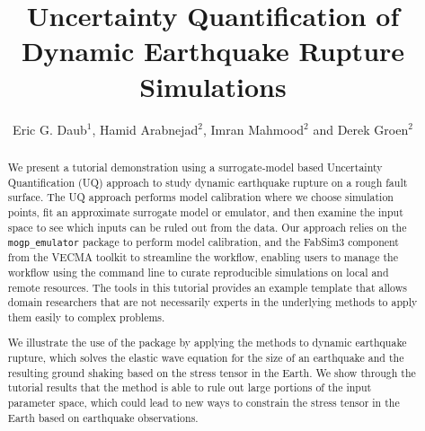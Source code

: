 \documentclass[openacc]{rstransa}%
\begin{document}
\title{Uncertainty Quantification of Dynamic Earthquake Rupture Simulations}

\author{%
Eric G. Daub$^{1}$, Hamid Arabnejad$^{2}$, Imran Mahmood$^{2}$ and Derek Groen$^{2}$}

\address{$^{1}$Research Engineering Group, Alan Turing Institute, London, UK\\
$^{2}$Department of Computer Science, Brunel University London, London, UK}

\subject{Geophysics, Computer modelling and simulation}



\begin{abstract}

We present a tutorial demonstration using a surrogate-model based Uncertainty Quantification (UQ)
approach to study dynamic earthquake rupture on a rough fault surface. The UQ approach performs
model calibration where we choose simulation points, fit an approximate surrogate
model or emulator, and then examine the input space to see which inputs can be ruled out from the data.
Our approach relies on the \texttt{mogp\_emulator} package to perform model calibration,
and the FabSim3 component from
the VECMA toolkit to streamline the workflow, enabling users to manage the workflow using the
command line to curate reproducible simulations on local and remote resources.
The tools in this tutorial provides an example template that allows domain researchers that are
not necessarily experts in the underlying
methods to apply them easily to complex problems.

We illustrate the use of the package by applying the methods to dynamic earthquake rupture, which solves
the elastic wave equation for the size of an earthquake and the resulting ground shaking based on the
stress tensor in the Earth. We show through the tutorial results that the method is able to rule out
large portions of the input parameter space, which could lead to new ways to constrain the stress tensor
in the Earth based on earthquake observations.

\end{abstract}
\end{document}
